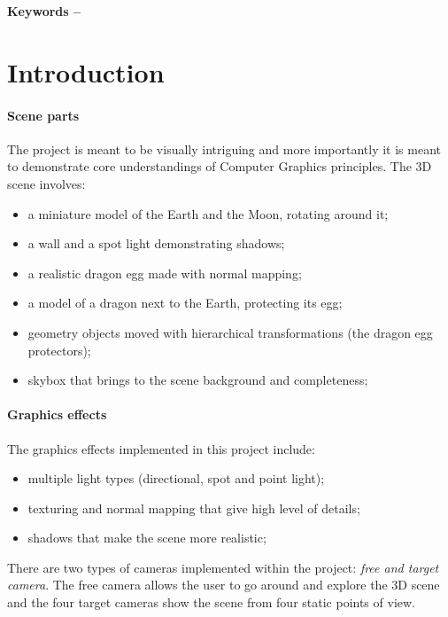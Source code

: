 \documentclass[10pt, a4paper]{article}
\title{\mytitle}
\author{\myauthor\hspace{1em}\\\contact\\Edinburgh Napier University\hspace{0.5em}-\hspace{0.5em}\mymodule}
\date{}
\begin{document}
	\maketitle
	\begin{abstract}
		 The aim of this project is to create a realistic 3D scene, rendered in real-time. The project is inspired by the series \textit{Games of Thrones} and previous years projects found on the games website of Napier University. A wide variety of graphics techniques were used to create the 3D scene, from multiple lights and light types to shadowing, material shading and transform hierarchy.
	\end{abstract}
    
	\textbf{Keywords -- }{\mykeywords}
	\section{Introduction}
    \paragraph{Scene parts} The project is meant to be visually intriguing and more importantly it is meant to demonstrate core understandings of Computer Graphics principles. The 3D scene involves:   
    \begin{itemize}
    	\item a miniature model of the Earth and the Moon, rotating around it;
    	\item a wall and a spot light demonstrating shadows;
    	\item a realistic dragon egg made with normal mapping;
    	\item a model of a dragon next to the Earth, protecting its egg;
    	\item geometry objects moved with hierarchical transformations (the dragon egg protectors);
    	\item skybox that brings to the scene background and completeness;
    \end{itemize}
	\paragraph{Graphics effects}The graphics effects implemented in this project include:
	\begin{itemize}
		\item multiple light types (directional, spot and point light);
		\item texturing and normal mapping that give high level of details;
		\item shadows that make the scene more realistic;
	\end{itemize}
    There are two types of cameras implemented within the project: \textit{free and target camera}. The free camera allows the user to go around and explore the 3D scene and the four target cameras show the scene from four static points of view.
    
\end{document}
